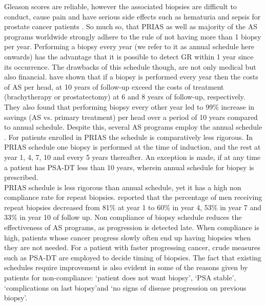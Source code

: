 Gleason scores are reliable, however the associated biopsies are difficult to conduct, cause pain and have serious side effects such as hematuria and sepsis for prostate cancer patients \citep{loeb2013systematic}. So much so, that PRIAS as well as majority of the AS programs worldwide strongly adhere to the rule of not having more than 1 biopsy per year. Performing a biopsy every year (we refer to it as annual schedule here onwards) has the advantage that it is possible to detect GR within 1 year since its occurrence. The drawbacks of this schedule though, are not only medical but also financial. \cite{keegan2012active} have shown that if a biopsy is performed every year then the costs of AS per head, at 10 years of follow-up exceed the costs of treatment (brachytherapy or prostatectomy) at 6 and 8 years of follow-up, respectively. They also found that performing biopsy every other year led to 99\% increase in savings (AS vs. primary treatment) per head over a period of 10 years compared to annual schedule. Despite this, several AS programs employ the annual schedule \citep{tosoian2011active,welty2015extended}. For patients enrolled in PRIAS the schedule is comparatively less rigorous. In PRIAS schedule one biopsy is performed at the time of induction, and the rest at year 1, 4, 7, 10 and every 5 years thereafter. An exception is made, if at any time a patient has PSA-DT less than 10 years, wherein annual schedule for biopsy is prescribed.\\

PRIAS schedule is less rigorous than annual schedule, yet it has a high non compliance rate for repeat biopsies. \cite{bokhorst2015compliance} reported that the percentage of men receiving repeat biopsies decreased from 81\% at year 1 to 60\% in year 4, 53\% in year 7 and 33\% in year 10 of follow up. Non compliance of biopsy schedule reduces the effectiveness of AS programs, as progression is detected late. When compliance is high, patients whose cancer progress slowly often end up having biopsies when they are not needed. For a patient with faster progressing cancer, crude measures such as PSA-DT are employed to decide timing of biopsies. The fact that existing schedules require improvement is also evident in some of the reasons given by patients for non-compliance:  \textquoteleft patient does not want biopsy\textquoteright, \textquoteleft PSA stable\textquoteright, \textquoteleft complications on last biopsy\textquoteright and \textquoteleft no signs of disease progression on previous biopsy\textquoteright.\\ 

